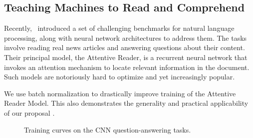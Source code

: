 \documentclass{article} %
\begin{document}
\subsection{Teaching Machines to Read and Comprehend}
\label{sec:less-attr}

Recently,~\citep{attentivereader} introduced a set of challenging benchmarks
for natural language processing, along with neural network architectures to
address them.  The tasks involve reading real news articles and answering
questions about their content.  Their principal model, the Attentive Reader, is
a recurrent neural network that invokes an attention mechanism to locate
relevant information in the document.  Such models are notoriously hard to
optimize and yet increasingly popular.

We use batch normalization to drastically improve training of the Attentive
Reader Model. This also demonstrates the generality and practical applicability
of our proposal .

\begin{figure}[!ht]
  \center%
  \hspace{2mm}%
  \caption{Training curves on the CNN question-answering tasks.}
  \label{fig:attr2}
\end{figure}
\end{document}
